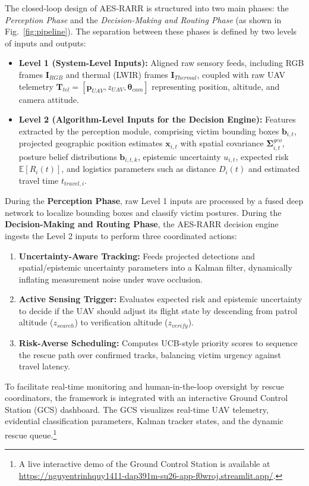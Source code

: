 \documentclass[runningheads]{llncs}
\newcommand{\aes}{AES-RARR}
\begin{document}
The closed-loop design of \aes{} is structured into two main phases: the \textit{Perception Phase} and the \textit{Decision-Making and Routing Phase} (as shown in Fig.~\ref{fig:pipeline}). The separation between these phases is defined by two levels of inputs and outputs:
\begin{itemize}
    \item \textbf{Level 1 (System-Level Inputs):} Aligned raw sensory feeds, including RGB frames $\mathbf{I}_{RGB}$ and thermal (LWIR) frames $\mathbf{I}_{Thermal}$, coupled with raw UAV telemetry $\mathbf{T}_{tel} = [\mathbf{p}_{UAV}, z_{UAV}, \boldsymbol{\theta}_{cam}]$ representing position, altitude, and camera attitude.
    \item \textbf{Level 2 (Algorithm-Level Inputs for the Decision Engine):} Features extracted by the perception module, comprising victim bounding boxes $\mathbf{b}_{i,t}$, projected geographic position estimates $\mathbf{x}_{i,t}$ with spatial covariance $\boldsymbol{\Sigma}^{geo}_{i,t}$, posture belief distributions $\mathbf{b}_{i,t,k}$, epistemic uncertainty $u_{i,t}$, expected risk $\mathbb{E}[R_i(t)]$, and logistics parameters such as distance $D_i(t)$ and estimated travel time $t_{travel,i}$.
\end{itemize}

During the \textbf{Perception Phase}, raw Level 1 inputs are processed by a fused deep network to localize bounding boxes and classify victim postures. During the \textbf{Decision-Making and Routing Phase}, the \aes{} decision engine ingests the Level 2 inputs to perform three coordinated actions:
\begin{enumerate}
    \item \textbf{Uncertainty-Aware Tracking:} Feeds projected detections and spatial/epistemic uncertainty parameters into a Kalman filter, dynamically inflating measurement noise under wave occlusion.
    \item \textbf{Active Sensing Trigger:} Evaluates expected risk and epistemic uncertainty to decide if the UAV should adjust its flight state by descending from patrol altitude ($z_{search}$) to verification altitude ($z_{verify}$).
    \item \textbf{Risk-Averse Scheduling:} Computes UCB-style priority scores to sequence the rescue path over confirmed tracks, balancing victim urgency against travel latency.
\end{enumerate}
To facilitate real-time monitoring and human-in-the-loop oversight by rescue coordinators, the framework is integrated with an interactive Ground Control Station (GCS) dashboard. The GCS visualizes real-time UAV telemetry, evidential classification parameters, Kalman tracker states, and the dynamic rescue queue.\footnote{A live interactive demo of the Ground Control Station is available at \url{https://nguyentrinhquy1411-dap391m-su26-app-f0wroj.streamlit.app/}.}
\end{document}
